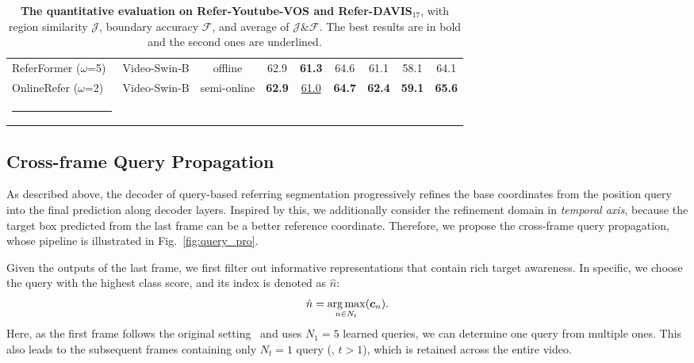 \documentclass[10pt,twocolumn,letterpaper]{article}
\makeatletter
\newcommand{\thickhline}{\noalign {\ifnum 0=`}\fi \hrule height 1pt
	\futurelet \reserved@a \@xhline
}
\makeatother
\begin{document}
\begin{table*}[t]
{\begin{tabular}{l||c|c|ccc|ccc}
                ReferFormer ($\omega$=5)~\cite{referformer} & Video-Swin-B & \textcolor{mygray}{offline} & 62.9 & \textbf{61.3} & 64.6 & 61.1 &58.1 &64.1\\
                \rowcolor[gray]{0.9}
                OnlineRefer ($\omega$=2) & Video-Swin-B & semi-online &  \textbf{62.9}& \underline{61.0} &\textbf{64.7}	& \textbf{62.4}	&\textbf{59.1} & \textbf{65.6} \\
			\hline \thickhline
	\end{tabular} }
	\vspace{-8pt}
	\caption{\textbf{The quantitative evaluation on Refer-Youtube-VOS  and Refer-DAVIS$_{17}$}, with region similarity $\mathcal{J}$, boundary accuracy $\mathcal{F}$, and average of $\mathcal{J}$\&$\mathcal{F}$. The best results are in bold and the second ones are underlined.}
	\vspace{-4mm}
	\label{table:sota_ytb}
\end{table*}



\subsection{Cross-frame Query Propagation}
\label{sec:query propagation}



As described above, the decoder of query-based referring segmentation progressively refines the base coordinates from the position query into the final prediction along decoder layers.
Inspired by this, we additionally consider the refinement domain in \textit{temporal axis}, because the target box predicted from the last frame can be a better reference coordinate.
Therefore, we propose the cross-frame query propagation, whose pipeline is illustrated in Fig.~\ref{fig:query_pro}.



Given the outputs of the last frame, we first filter out informative representations that contain rich target awareness.
In specific, we choose the query with the highest class score, and its index is denoted as $\hat{n}$:
\begin{equation}
\small
\vspace{-3pt}
    \hat{n} = \mathop{\arg\max}\limits_{n\in N_t} (\bm{c}_n).
\vspace{-1pt}
\end{equation}
Here, as the first frame follows the original setting~\cite{deformable} and uses $N_1\!=\!5$ learned queries, we can determine one query from multiple ones.
This also leads to the subsequent frames containing only $N_t\!=\!1$ query (\ie, $t\!>\!1
$), which is retained across the entire video.
\end{document}
